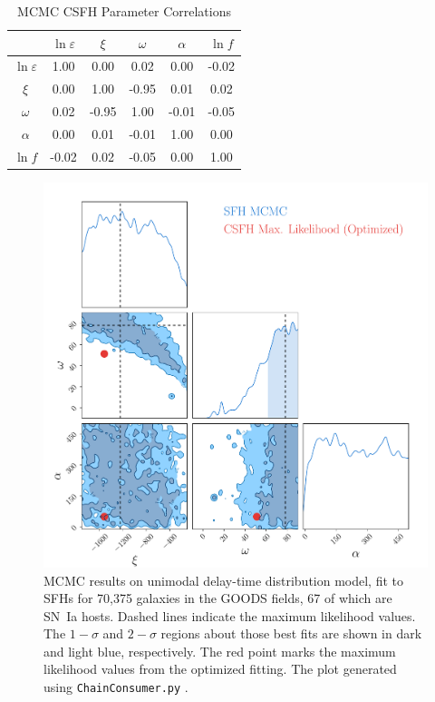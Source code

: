 \documentclass[apj]{aastex62}
\begin{document}
\begin{table}[h]
    \centering
    \caption{MCMC CSFH Parameter Correlations}
    \label{tab:parameter_correlations1}
    \begin{tabular}{c|ccccc}
         & $\ln\varepsilon$ & $\xi$ & $\omega$ & $\alpha$ & $\ln f$\\ 
        \hline
        $\ln\varepsilon$ &  1.00 &  0.00 &  0.02 &  0.00 & -0.02 \\ 
                   $\xi$ &  0.00 &  1.00 & -0.95 &  0.01 &  0.02 \\ 
                $\omega$ &  0.02 & -0.95 &  1.00 & -0.01 & -0.05 \\ 
                $\alpha$ &  0.00 &  0.01 & -0.01 &  1.00 &  0.00 \\ 
                 $\ln f$ & -0.02 &  0.02 & -0.05 &  0.00 &  1.00 \\ 
        \hline
    \end{tabular}
\end{table}
\clearpage
\begin{figure}[t] 
   \centering
   \includegraphics[width=5.0in]{figure_sfh_corners.pdf} 
   \caption{\footnotesize MCMC results on unimodal delay-time distribution model, fit to SFHs for 70,375 galaxies in the GOODS fields, 67 of which are SN~Ia hosts. Dashed lines indicate the maximum likelihood values. The $1-\sigma$ and $2-\sigma$ regions about those best fits are shown in dark and light blue, respectively. The red point marks the maximum likelihood values from the optimized fitting. The plot generated using {\tt ChainConsumer.py} \citep{Hinton:2016qy}.}
   \label{fig:mcmc_sfh}
\end{figure}
\end{document}
